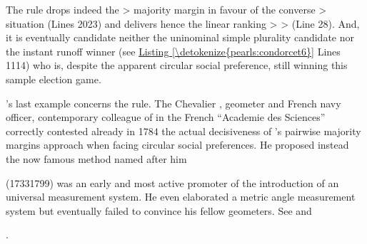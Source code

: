 \documentclass[a4paper,12pt,english]{sphinxhowto}
\begin{document}
\begin{sphinxVerbatim}[commandchars=\\\{\},numbers=left,firstnumber=1,stepnumber=1]
\end{sphinxVerbatim}
\sphinxresetverbatimhllines

\sphinxAtStartPar
The  rule drops indeed the  \textgreater{}  majority margin in favour of the converse  \textgreater{}  situation (Lines 20\sphinxhyphen{}23) and delivers hence the linear ranking  \textgreater{}  \textgreater{}  (Line 28). And, it is eventually candidate  \textendash{}neither the uninominal simple plurality candidate nor the instant runoff winner (see \hyperref[\detokenize{pearls:condorcet6}]{Listing \ref{\detokenize{pearls:condorcet6}}} Lines 11\sphinxhyphen{}14)\textendash{} who is, despite the apparent circular social preference, still winning this sample election game.

\sphinxAtStartPar
{}’s last example concerns the  rule. The Chevalier , geometer and French navy officer, contemporary colleague of  in the French “Academie des Sciences” correctly contested already in 1784 the actual decisiveness of ’s pairwise majority margins approach when facing circular social preferences. He proposed instead the now famous  method named after him %
\begin{footnote}[17]\sphinxAtStartFootnote
{} (1733\sphinxhyphen{}1799) was an early and most active promoter of the introduction of an universal  measurement system. He even elaborated a metric angle measurement system but eventually failed to convince his fellow geometers. See  and 
%
\end{footnote}.
\end{document}
